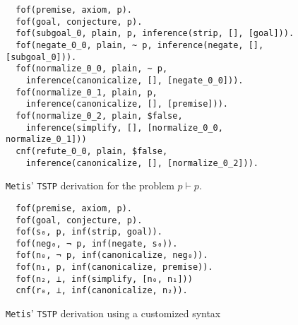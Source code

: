 \documentclass[../main.tex]{subfiles}
\begin{document}
\begin{subappendices}
\begin{figure}
\begin{verbatim}
  fof(premise, axiom, p).
  fof(goal, conjecture, p).
  fof(subgoal_0, plain, p, inference(strip, [], [goal])).
  fof(negate_0_0, plain, ~ p, inference(negate, [], [subgoal_0])).
  fof(normalize_0_0, plain, ~ p,
    inference(canonicalize, [], [negate_0_0])).
  fof(normalize_0_1, plain, p,
    inference(canonicalize, [], [premise])).
  fof(normalize_0_2, plain, $false,
    inference(simplify, [], [normalize_0_0, normalize_0_1]))
  cnf(refute_0_0, plain, $false,
    inference(canonicalize, [], [normalize_0_2])).
\end{verbatim}
\caption{\texttt{Metis}' \texttt{TSTP} derivation for the
problem $p\vdash p$.}
\label{fig:metis-proof-tstp}
\end{figure}

\clearpage
\begin{figure}[!ht]
\begin{verbatim}
  fof(premise, axiom, p).
  fof(goal, conjecture, p).
  fof(s₀, p, inf(strip, goal)).
  fof(neg₀, ¬ p, inf(negate, s₀)).
  fof(n₀, ¬ p, inf(canonicalize, neg₀)).
  fof(n₁, p, inf(canonicalize, premise)).
  fof(n₂, ⊥, inf(simplify, [n₀, n₁]))
  cnf(r₀, ⊥, inf(canonicalize, n₂)).
\end{verbatim}
\caption{\texttt{Metis}' \texttt{TSTP} derivation using a customized syntax}
\label{fig:metis-proof-tstp-customized}
\end{figure}
\vfill


\end{subappendices}
\end{document}
